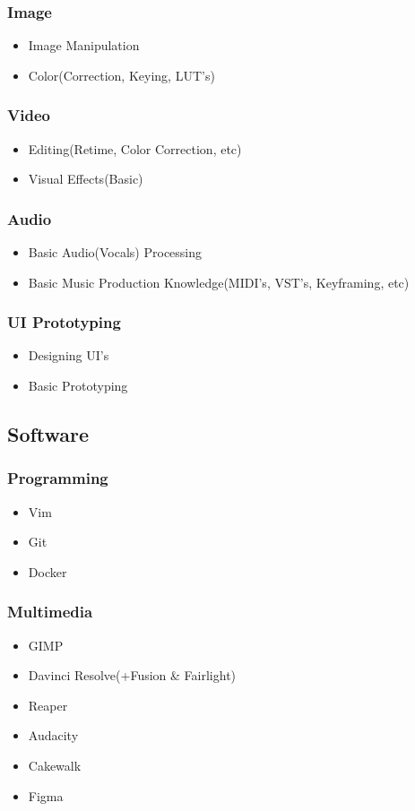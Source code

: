 \documentclass{article}
\begin{document}
			\subsubsection{Image}
				\begin{itemize}
					\item Image Manipulation
					\item Color(Correction, Keying, LUT's)
				\end{itemize}
			\subsubsection{Video}
				\begin{itemize}
					\item Editing(Retime, Color Correction, etc)
					\item Visual Effects(Basic)
				\end{itemize}
			\subsubsection{Audio}
				\begin{itemize}
					\item Basic Audio(Vocals) Processing
					\item Basic Music Production Knowledge(MIDI's, VST's, Keyframing, etc)
				\end{itemize}
			\subsubsection{UI Prototyping}
				\begin{itemize}
					\item Designing UI's
					\item Basic Prototyping
				\end{itemize}
		\subsection{Software}
			\subsubsection{Programming}
				\begin{itemize}
					\item Vim
					\item Git
					\item Docker
				\end{itemize}
			\subsubsection{Multimedia}
				\begin{itemize}
					\item GIMP
					\item Davinci Resolve(+Fusion \& Fairlight)
					\item Reaper
					\item Audacity
					\item Cakewalk
					\item Figma
				\end{itemize}
\end{document}
